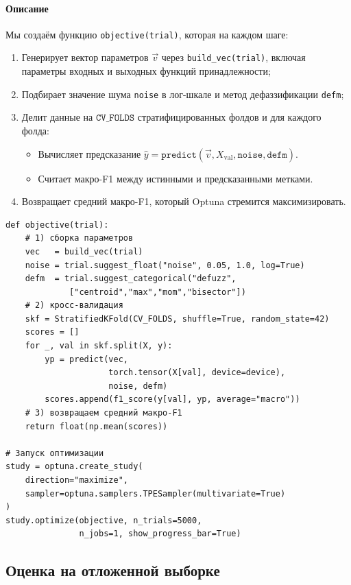 \paragraph{Описание}  
Мы создаём функцию \texttt{objective(trial)}, которая на каждом шаге:
\begin{enumerate}
  \item Генерирует вектор параметров \(\vec v\) через \texttt{build\_vec(trial)}, включая параметры входных и выходных функций принадлежности;
  \item Подбирает значение шума \texttt{noise} в лог-шкале и метод дефаззификации \texttt{defm};
  \item Делит данные на \(\texttt{CV\_FOLDS}\) стратифицированных фолдов и для каждого фолда:
    \begin{itemize}
      \item Вычисляет предсказание \(\hat y=\texttt{predict}(\vec v, X_{\text{val}}, \texttt{noise}, \texttt{defm})\).
      \item Считает макро-F1 между истинными и предсказанными метками.
    \end{itemize}
  \item Возвращает средний макро-F1, который Optuna стремится максимизировать.
\end{enumerate}

\begin{verbatim}
def objective(trial):
    # 1) сборка параметров
    vec   = build_vec(trial)
    noise = trial.suggest_float("noise", 0.05, 1.0, log=True)
    defm  = trial.suggest_categorical("defuzz",
             ["centroid","max","mom","bisector"])
    # 2) кросс-валидация
    skf = StratifiedKFold(CV_FOLDS, shuffle=True, random_state=42)
    scores = []
    for _, val in skf.split(X, y):
        yp = predict(vec,
                     torch.tensor(X[val], device=device),
                     noise, defm)
        scores.append(f1_score(y[val], yp, average="macro"))
    # 3) возвращаем средний макро-F1
    return float(np.mean(scores))

# Запуск оптимизации
study = optuna.create_study(
    direction="maximize",
    sampler=optuna.samplers.TPESampler(multivariate=True)
)
study.optimize(objective, n_trials=5000,
               n_jobs=1, show_progress_bar=True)
\end{verbatim}

\subsection{Оценка на отложенной выборке}

